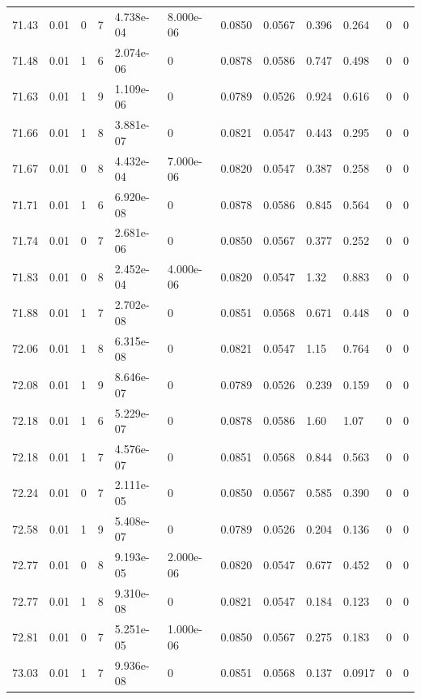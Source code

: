 \documentclass[preview]{standalone}
\begin{document}
{{{{{{{{{{{{{{{{{{{\begin{tabular}{L{1.2cm}C{1.2cm} C{0.3cm}C{0.5cm} C{1.4cm}C{1.4cm} C{1.4cm}C{1.4cm} C{1.6cm}C{1.6cm} C{1.6cm}C{1.6cm}}
  71.43  &  0.01  & 0     &  7 &  4.738e-04  & 8.000e-06  &  0.0850&   0.0567& 0.396 & 0.264   &  0 & 0  \\ 
  71.48  &  0.01  & 1     &  6 &  2.074e-06  & 0  &  0.0878&   0.0586& 0.747 & 0.498   &  0 & 0  \\ 
  71.63  &  0.01  & 1     &  9 &  1.109e-06  & 0  &  0.0789&   0.0526& 0.924 & 0.616   &  0 & 0  \\ 
  71.66  &  0.01  & 1     &  8 &  3.881e-07  & 0  &  0.0821&   0.0547& 0.443 & 0.295   &  0 & 0  \\ 
  71.67  &  0.01  & 0     &  8 &  4.432e-04  & 7.000e-06  &  0.0820&   0.0547& 0.387 & 0.258   &  0 & 0  \\ 
  71.71  &  0.01  & 1     &  6 &  6.920e-08  & 0  &  0.0878&   0.0586& 0.845 & 0.564   &  0 & 0  \\ 
  71.74  &  0.01  & 0     &  7 &  2.681e-06  & 0  &  0.0850&   0.0567& 0.377 & 0.252   &  0 & 0  \\ 
  71.83  &  0.01  & 0     &  8 &  2.452e-04  & 4.000e-06  &  0.0820&   0.0547& 1.32 & 0.883   &  0 & 0  \\ 
  71.88  &  0.01  & 1     &  7 &  2.702e-08  & 0  &  0.0851&   0.0568& 0.671 & 0.448   &  0 & 0  \\ 
  72.06  &  0.01  & 1     &  8 &  6.315e-08  & 0  &  0.0821&   0.0547& 1.15 & 0.764   &  0 & 0  \\ 
  72.08  &  0.01  & 1     &  9 &  8.646e-07  & 0  &  0.0789&   0.0526& 0.239 & 0.159   &  0 & 0  \\ 
  72.18  &  0.01  & 1     &  6 &  5.229e-07  & 0  &  0.0878&   0.0586& 1.60 & 1.07   &  0 & 0  \\ 
  72.18  &  0.01  & 1     &  7 &  4.576e-07  & 0  &  0.0851&   0.0568& 0.844 & 0.563   &  0 & 0  \\ 
  72.24  &  0.01  & 0     &  7 &  2.111e-05  & 0  &  0.0850&   0.0567& 0.585 & 0.390   &  0 & 0  \\ 
  72.58  &  0.01  & 1     &  9 &  5.408e-07  & 0  &  0.0789&   0.0526& 0.204 & 0.136   &  0 & 0  \\ 
  72.77  &  0.01  & 0     &  8 &  9.193e-05  & 2.000e-06  &  0.0820&   0.0547& 0.677 & 0.452   &  0 & 0  \\ 
  72.77  &  0.01  & 1     &  8 &  9.310e-08  & 0  &  0.0821&   0.0547& 0.184 & 0.123   &  0 & 0  \\ 
  72.81  &  0.01  & 0     &  7 &  5.251e-05  & 1.000e-06  &  0.0850&   0.0567& 0.275 & 0.183   &  0 & 0  \\ 
  73.03  &  0.01  & 1     &  7 &  9.936e-08  & 0  &  0.0851&   0.0568& 0.137 & 0.0917   &  0 & 0  \\ 

\end{tabular}}}}}}}}}}}}}}}}}}}}
\end{document}

